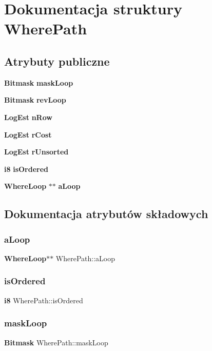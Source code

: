 \section{Dokumentacja struktury Where\+Path}
\label{struct_where_path}
\subsection*{Atrybuty publiczne}
\begin{DoxyCompactItemize}
\item 
\textbf{ Bitmask} \textbf{ mask\+Loop}
\item 
\textbf{ Bitmask} \textbf{ rev\+Loop}
\item 
\textbf{ Log\+Est} \textbf{ n\+Row}
\item 
\textbf{ Log\+Est} \textbf{ r\+Cost}
\item 
\textbf{ Log\+Est} \textbf{ r\+Unsorted}
\item 
\textbf{ i8} \textbf{ is\+Ordered}
\item 
\textbf{ Where\+Loop} $\ast$$\ast$ \textbf{ a\+Loop}
\end{DoxyCompactItemize}


\subsection{Dokumentacja atrybutów składowych}
\mbox{\label{struct_where_path_a63e12088b414ce0b0b1ee43655733dd1}} 
\subsubsection{aLoop}
{\footnotesize\ttfamily \textbf{ Where\+Loop}$\ast$$\ast$ Where\+Path\+::a\+Loop}

\mbox{\label{struct_where_path_a2793b5b50bc1ec2cf8f9c6e5744c2826}} 
\subsubsection{isOrdered}
{\footnotesize\ttfamily \textbf{ i8} Where\+Path\+::is\+Ordered}

\mbox{\label{struct_where_path_a4a0a59d31e51c3a8f9fdfdbfb384ab73}} 
\subsubsection{maskLoop}
{\footnotesize\ttfamily \textbf{ Bitmask} Where\+Path\+::mask\+Loop}

